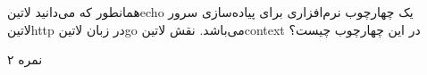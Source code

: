 \documentclass[../main.tex]{subfiles}
\begin{document}

همانطور که می‌دانید ‌لاتین{echo} یک چهارچوب نرم‌افزاری برای پیاده‌سازی سرور ‌لاتین{http} در زبان ‌لاتین{go} می‌باشد. نقش ‌لاتین{context} در این چهارچوب چیست؟

۲ نمره
\end{document}
